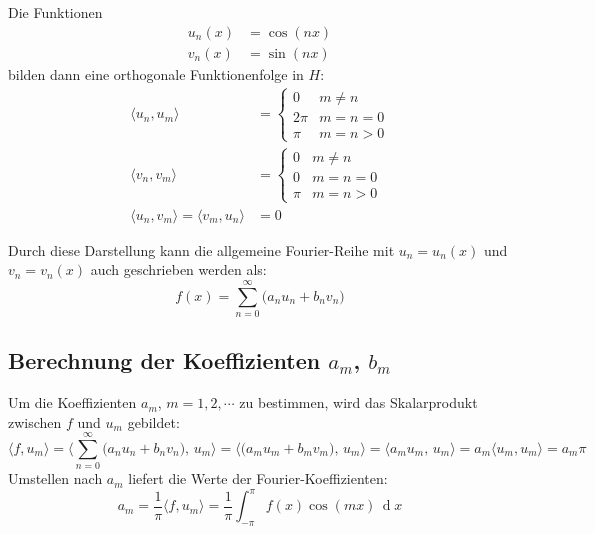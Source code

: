 \documentclass[a4paper, 11pt, accentcolor = tud3b]{tudreport}
\DeclareMathOperator{\total}{d}
\newcommand{\dif}[1]{\,\total#1}
\begin{document}
				Die Funktionen
				\begin{align*}
					u_n(x) &= \cos(nx) \\
					v_n(x) &= \sin(nx)
				\end{align*}
				bilden dann eine orthogonale Funktionenfolge in \(H\):
				\begin{align*}
					\langle u_n, u_m \rangle &=
						\begin{cases}
							0    & m \neq n  \\
							2\pi & m = n = 0 \\
							\pi  & m = n > 0
						\end{cases} \\
					\langle v_n, v_m \rangle &=
						\begin{cases}
							0   & m \neq n  \\
							0   & m = n = 0 \\
							\pi & m = n > 0
						\end{cases} \\
					\langle u_n, v_m \rangle = \langle v_m, u_n \rangle &= 0
				\end{align*}
				
				Durch diese Darstellung kann die allgemeine Fourier-Reihe mit \( u_n = u_n(x) \) und \( v_n = v_n(x) \) auch geschrieben werden als:
				\begin{equation*}
					f(x) = \sum_{n = 0}^{\infty} \big( a_n u_n + b_n v_n \big)
				\end{equation*}

			\subsection{Berechnung der Koeffizienten \(a_m\), \(b_m\)}
				Um die Koeffizienten \( a_m \), \( m = 1, 2, \cdots \) zu bestimmen, wird das Skalarprodukt zwischen \(f\) und \( u_m \) gebildet:
				\begin{equation*}
					\langle f, u_m \rangle
						= \Bigg\langle \sum_{n = 0}^{\infty} \big( a_n u_n + b_n v_n \big),\, u_m \Bigg\rangle
						= \Big\langle \big( a_m u_m + b_m v_m \big),\, u_m \Big\rangle
						= \langle a_m u_m,\, u_m \rangle
						= a_m \langle u_m, u_m \rangle
						= a_m \pi
				\end{equation*}
				Umstellen nach \( a_m \) liefert die Werte der Fourier-Koeffizienten:
				\begin{equation*}
					a_m = \frac{1}{\pi} \langle f, u_m \rangle = \frac{1}{\pi} \int_{-\pi}^{\pi} \! f(x) \cos(mx) \dif{x}
				\end{equation*}
				
\end{document}
